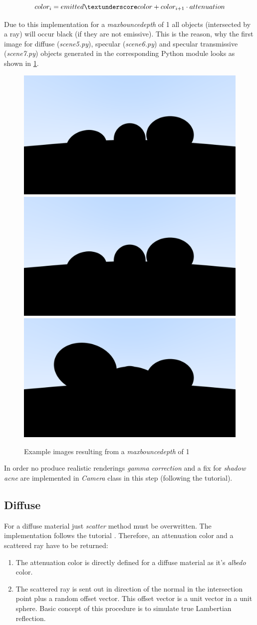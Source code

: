 \documentclass[]{article}
\begin{document}
		\begin{equation}
			\label{eq:color}
			color_i = emitted\textunderscore color + color_{i+1}\cdot attenuation
		\end{equation}
		
		Due to this implementation for a \emph{max\textunderscore bounce\textunderscore depth} of 1 all objects (intersected by a ray) will occur black (if they are not emissive). This is the reason, why the first image for diffuse (\emph{scene5.py}), specular (\emph{scene6.py}) and specular transmissive (\emph{scene7.py}) objects generated in the corresponding Python module looks as shown in \cref{fig:image567-black}.
		
		\begin{figure}[h]
			\centering
			\includegraphics[width=0.3\linewidth]{image5}
			\includegraphics[width=0.3\linewidth]{image6}
			\includegraphics[width=0.3\linewidth]{image7}
			\caption{Example images resulting from a \emph{max\textunderscore bounce\textunderscore depth} of 1}
			\label{fig:image567-black}
		\end{figure}
	
		In order no produce realistic renderings \emph{gamma correction} and a fix for \emph{shadow acne} are implemented in \emph{Camera} class in this step (following the tutorial).	
		
		\subsection{Diffuse}
		For a diffuse material just \emph{scatter} method must be overwritten. The implementation follows the tutorial \cite{Shirley2020RTW1}. Therefore, an attenuation color and a scattered ray have to be returned:
		\begin{enumerate}
			\item{The attenuation color is directly defined for a diffuse material as it’s \emph{albedo} color.}
			\item{The scattered ray is sent out in direction of the normal in the intersection point plus a random offset vector. This offset vector is a unit vector in a unit sphere. Basic concept of this procedure is to simulate true Lambertian reflection.}
		\end{enumerate}
	
\end{document}
